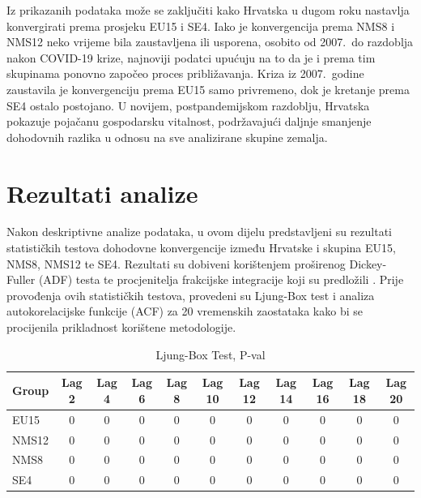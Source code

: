 \documentclass{crebsshr}
\begin{document}
Iz prikazanih podataka može se zaključiti kako Hrvatska u dugom roku nastavlja konvergirati prema prosjeku EU15 i SE4. Iako je konvergencija prema NMS8 i NMS12 neko vrijeme bila zaustavljena ili usporena, osobito od 2007.\ do razdoblja nakon COVID-19 krize, najnoviji podatci upućuju na to da je i prema tim skupinama ponovno započeo proces približavanja. Kriza iz 2007.\ godine zaustavila je konvergenciju prema EU15 samo privremeno, dok je kretanje prema SE4 ostalo postojano. U novijem, postpandemijskom razdoblju, Hrvatska pokazuje pojačanu gospodarsku vitalnost, podržavajući daljnje smanjenje dohodovnih razlika u odnosu na sve analizirane skupine zemalja.

\section{Rezultati analize}

Nakon deskriptivne analize podataka, u ovom dijelu predstavljeni su rezultati statističkih testova dohodovne konvergencije između Hrvatske i skupina EU15, NMS8, NMS12 te SE4. Rezultati su dobiveni korištenjem proširenog Dickey-Fuller (ADF) testa te procjenitelja frakcijske integracije koji su predložili \cite{geweke-porter:83}. Prije provođenja ovih statističkih testova, provedeni su Ljung-Box test i analiza autokorelacijske funkcije (ACF) za 20 vremenskih zaostataka kako bi se procijenila prikladnost korištene metodologije.

\begin{table}[ht]
\centering
\caption{Ljung-Box Test, P-val}
\label{tab:tablica1}
\begin{tabular}{lcccccccccc}
\toprule
\textbf{Group} & \textbf{Lag 2} & \textbf{Lag 4} & \textbf{Lag 6} & \textbf{Lag 8} & \textbf{Lag 10} & \textbf{Lag 12} & \textbf{Lag 14} & \textbf{Lag 16} & \textbf{Lag 18} & \textbf{Lag 20} \\
\midrule
EU15  & 0 & 0 & 0 & 0 & 0 & 0 & 0 & 0 & 0 & 0 \\
NMS12 & 0 & 0 & 0 & 0 & 0 & 0 & 0 & 0 & 0 & 0 \\
NMS8  & 0 & 0 & 0 & 0 & 0 & 0 & 0 & 0 & 0 & 0 \\
SE4   & 0 & 0 & 0 & 0 & 0 & 0 & 0 & 0 & 0 & 0 \\
\bottomrule
\end{tabular}
\end{table}
\end{document}

